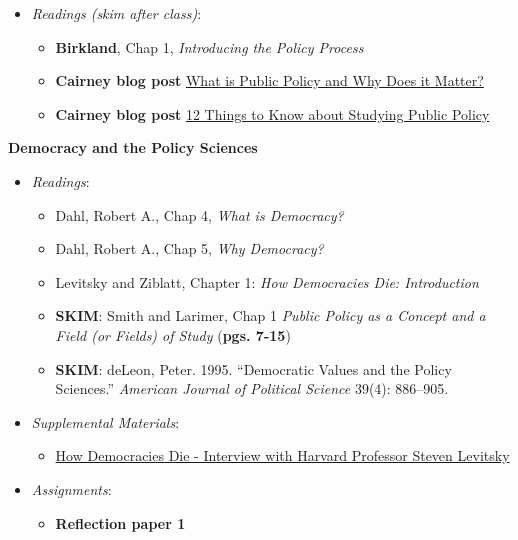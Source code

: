 \begin{itemize}

\item
  \emph{Readings (skim after class)}:

  \begin{itemize}
  
  \item
    \textbf{Birkland}, Chap 1, \emph{Introducing the Policy Process}
  \item
    \textbf{Cairney blog post}
    \href{https://paulcairney.wordpress.com/2016/04/28/policy-in-500-words-what-is-public-policy-and-why-does-it-matter/}{What
    is Public Policy and Why Does it Matter?}
  \item
    \textbf{Cairney blog post}
    \href{https://paulcairney.wordpress.com/2015/10/29/12-things-to-know-about-studying-public-policy/}{12
    Things to Know about Studying Public Policy}
  \end{itemize}
\end{itemize}

\week \textbf{Democracy and the Policy Sciences}

\begin{itemize}

\item
  \emph{Readings}:

  \begin{itemize}
  
  \item
    Dahl, Robert A., Chap 4, \emph{What is Democracy?}
  \item
    Dahl, Robert A., Chap 5, \emph{Why Democracy?}
  \item
    Levitsky and Ziblatt, Chapter 1: \emph{How Democracies Die:
    Introduction}
  \item
    \textbf{SKIM}: Smith and Larimer, Chap 1 \emph{Public Policy as a
    Concept and a Field (or Fields) of Study} (\textbf{pgs. 7-15})
  \item
    \textbf{SKIM}: deLeon, Peter. 1995. ``Democratic Values and the
    Policy Sciences.'' \emph{American Journal of Political Science}
    39(4): 886--905.
  \end{itemize}
\item
  \emph{Supplemental Materials}:

  \begin{itemize}
  
  \item
    \faYoutube \hspace{0.005in} \href{https://youtu.be/EdB1zr1GplA}{How
    Democracies Die - Interview with Harvard Professor Steven Levitsky}
  \end{itemize}
\item
  \emph{Assignments}:

  \begin{itemize}
  
  \item
    \textbf{Reflection paper 1}
  \end{itemize}
\end{itemize}

